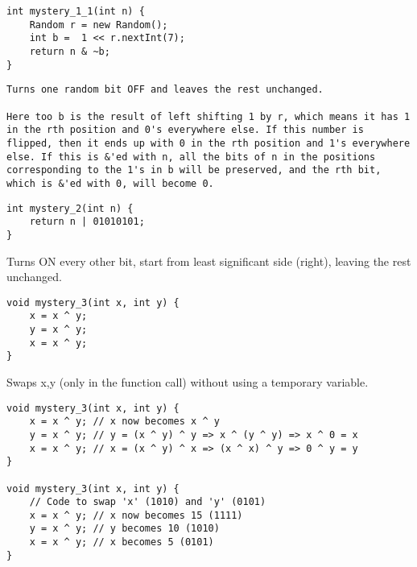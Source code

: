 \begin{lstlisting}
int mystery_1_1(int n) {
    Random r = new Random();
	int b =  1 << r.nextInt(7); 
    return n & ~b;
}
\end{lstlisting}


\begin{solution}
\begin{lstlisting}
Turns one random bit OFF and leaves the rest unchanged.

Here too b is the result of left shifting 1 by r, which means it has 1 in the rth position and 0's everywhere else. If this number is flipped, then it ends up with 0 in the rth position and 1's everywhere else. If this is &'ed with n, all the bits of n in the positions corresponding to the 1's in b will be preserved, and the rth bit, which is &'ed with 0, will become 0. 
\end{lstlisting}
\end{solution}

\begin{lstlisting}
int mystery_2(int n) {
	return n | 01010101;
}
\end{lstlisting}
\begin{solution}
Turns ON every other bit, start from least significant side (right), leaving the rest unchanged.

\end{solution}

\begin{lstlisting}
void mystery_3(int x, int y) {
    x = x ^ y; 
    y = x ^ y; 
    x = x ^ y; 
}
\end{lstlisting}
\begin{solution}
Swaps x,y (only in the function call) without using a temporary variable.

\begin{lstlisting}
void mystery_3(int x, int y) {
    x = x ^ y; // x now becomes x ^ y 
    y = x ^ y; // y = (x ^ y) ^ y => x ^ (y ^ y) => x ^ 0 = x 
    x = x ^ y; // x = (x ^ y) ^ x => (x ^ x) ^ y => 0 ^ y = y
}

void mystery_3(int x, int y) {
    // Code to swap 'x' (1010) and 'y' (0101) 
    x = x ^ y; // x now becomes 15 (1111) 
    y = x ^ y; // y becomes 10 (1010) 
    x = x ^ y; // x becomes 5 (0101) 
}
\end{lstlisting}
\end{solution}